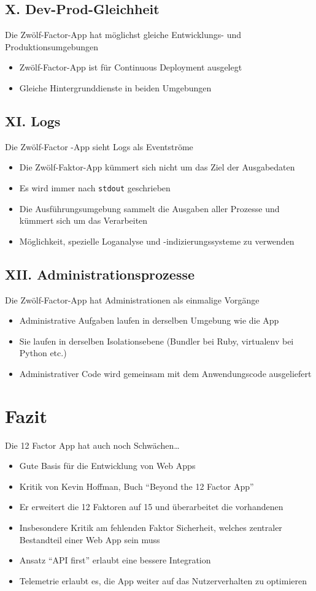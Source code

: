 \documentclass[fleqn,10pt]{SelfArx} %
\begin{document}
\subsection{X. Dev-Prod-Gleichheit}
Die Zwölf-Factor-App hat möglichst gleiche Entwicklungs- und Produktionsumgebungen
\begin{itemize}
	\item Zwölf-Factor-App ist für Continuous Deployment ausgelegt
	\item Gleiche Hintergrunddienste in beiden Umgebungen
\end{itemize}
\subsection{XI. Logs}
Die Zwölf-Factor -App sieht Logs als Eventströme
\begin{itemize}
	\item Die Zwölf-Faktor-App kümmert sich nicht um das Ziel der Ausgabedaten
	\item Es wird immer nach \texttt{stdout} geschrieben
	\item Die Ausführungsumgebung sammelt die Ausgaben aller Prozesse und kümmert sich um das Verarbeiten
	\item Möglichkeit, spezielle Loganalyse und -indizierungssysteme zu verwenden
\end{itemize}
\subsection{XII. Administrationsprozesse}
Die Zwölf-Factor-App hat Administrationen als einmalige Vorgänge
\begin{itemize}
	\item Administrative Aufgaben laufen in derselben Umgebung wie die App
	\item Sie laufen in derselben Isolationsebene (Bundler bei Ruby, virtualenv bei Python etc.)
	\item Administrativer Code wird gemeinsam mit dem Anwendungscode ausgeliefert
\end{itemize}
\section{Fazit}
Die 12 Factor App hat auch noch Schwächen\ldots
	\begin{itemize}
	\item Gute Basis für die Entwicklung von Web Apps
	\item Kritik von Kevin Hoffman, Buch \enquote{Beyond the 12 Factor App}~\cite{beyond}
	\item Er erweitert die 12 Faktoren auf 15 und überarbeitet die vorhandenen
	\item Insbesondere Kritik am fehlenden Faktor Sicherheit, welches zentraler Bestandteil einer Web App sein muss
	\item Ansatz \enquote{API first} erlaubt eine bessere Integration
	\item Telemetrie erlaubt es, die App weiter auf das Nutzerverhalten zu optimieren
\end{itemize}
\end{document}
